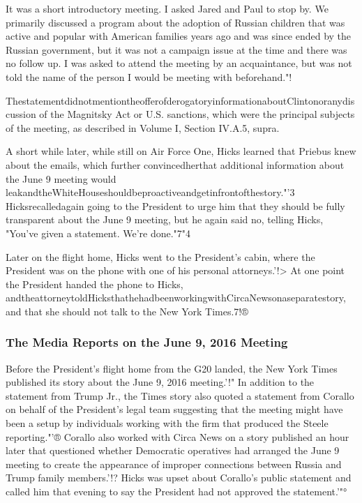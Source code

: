 It was a short introductory meeting.
I asked Jared and Paul to stop by.
We primarily discussed a program about the adoption of Russian children that was active and popular with American families years ago and was since ended by the Russian government, but it was not a campaign issue at the time and there was no follow up.
I was asked to attend the meeting by an acquaintance, but was not told the name of the person I would be meeting with beforehand."!

ThestatementdidnotmentiontheofferofderogatoryinformationaboutClintonoranydiscussion of the Magnitsky Act or U.S. sanctions, which were the principal subjects of the meeting, as described in Volume I, Section IV.A.5, supra.

A short while later, while still on Air Force One, Hicks learned that Priebus knew about the emails, which further convincedherthat additional information about the June 9 meeting would leakandtheWhiteHouseshouldbeproactiveandgetinfrontofthestory."'3
Hicksrecalledagain going to the President to urge him that they should be fully transparent about the June 9 meeting, but he again said no, telling Hicks, "You've given a statement.
We're done."7"4

Later on the flight home, Hicks went to the President's cabin, where the President was on the phone with one of his personal attorneys.'!>
At one point the President handed the phone to Hicks, andtheattorneytoldHicksthathehadbeenworkingwithCircaNewsonaseparatestory, and that she should not talk to the New York Times.7!®

\subsubsection{The Media Reports on the June 9, 2016 Meeting}

Before the President's flight home from the G20 landed, the New York Times published its story about the June 9, 2016 meeting.'!"
In addition to the statement from Trump Jr., the Times story also quoted a statement from Corallo on behalf of the President's legal team suggesting that the meeting might have been a setup by individuals working with the firm that produced the Steele reporting."'®
Corallo also worked with Circa News on a story published an hour later that questioned whether Democratic operatives had arranged the June 9 meeting to create the appearance of improper connections between Russia and Trump family members.'!?
Hicks was upset about Corallo's public statement and called him that evening to say the President had not approved the statement.'"°

